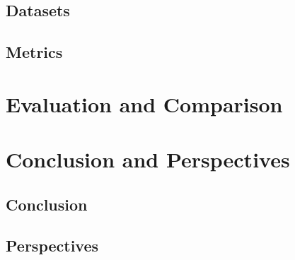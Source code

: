 \documentclass[runningheads]{llncs}
\begin{document}
\subsection{Datasets}
\subsection{Metrics}

\section{Evaluation and Comparison}

\section{Conclusion and Perspectives}
\subsection{Conclusion}
\subsection{Perspectives}
\end{document}
